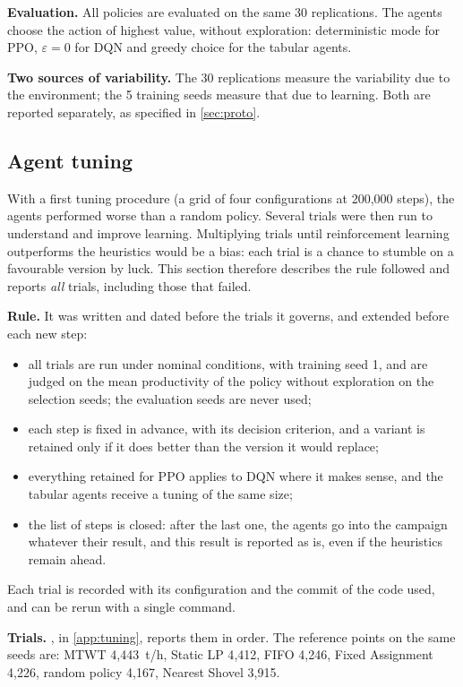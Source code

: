 \documentclass[11pt,a4paper]{article}
\newif\ifrevmarks
\newcommand{\revtag}[1]{\ifrevmarks\textsuperscript{\textcolor{red!70!black}{\scriptsize[#1]}}\fi}
\newenvironment{revbloc}[1]{\par\ifrevmarks\color{revcolor}\noindent\revtag{#1}\ \fi}{\par}
\newif\ifcorrmarks
\newcommand{\corr}[1]{\ifcorrmarks\textcolor{corrcolor}{#1}\else#1\fi}
\begin{document}
\begin{revbloc}{M1, M7, m19, A, v3}
\textbf{Evaluation.} All policies are evaluated on the same 30 replications. The agents choose the action of highest value, without exploration: deterministic mode for PPO, $\varepsilon = 0$ for DQN and greedy choice for the tabular agents.

\textbf{Two sources of variability.} The 30 replications measure the variability due to the environment; the 5 training seeds measure that due to learning. Both are reported separately, as specified in \cref{sec:proto}.
\end{revbloc}

\subsection{Agent tuning}
\label{sec:tuning}

\begin{revbloc}{M7, M12, v3}
With a first tuning procedure (a grid of four configurations at 200{,}000 steps), the agents performed worse than a random policy. Several trials were then run to understand and improve learning. Multiplying trials until reinforcement learning outperforms the heuristics would be a bias: each trial is a chance to stumble on a favourable version by luck. This section therefore describes the rule followed and reports \emph{all} trials, including those that failed.

\textbf{Rule.} It was written and dated before the trials it governs, and extended before each new step:
\begin{itemize}
  \item all trials are run under nominal conditions, with training seed 1, and are judged on the mean productivity of the policy without exploration on the selection seeds; the evaluation seeds are never used;
  \item each step is fixed in advance, with its decision criterion, and a variant is retained only if it does better than the version it would replace;
  \item everything retained for PPO applies to DQN where it makes sense, and the tabular agents receive a tuning of the same size;
  \item the list of steps is closed: after the last one, the agents go into the campaign whatever their result, and this result is reported as is, even if the heuristics remain ahead.
\end{itemize}
Each trial is recorded with its configuration and the commit of the code used, and can be rerun with a single command.

\textbf{Trials.} \corr{, in \cref{app:tuning},} reports them in order. The reference points on the same seeds are: MTWT 4{,}443~t/h, \corr{Static LP} 4{,}412, FIFO 4{,}246, Fixed Assignment 4{,}226, random policy 4{,}167, Nearest Shovel 3{,}915.
\end{revbloc}
\end{document}
